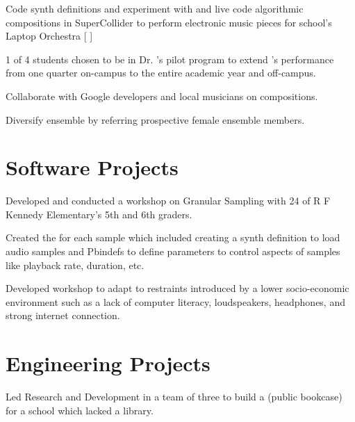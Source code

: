 \documentclass[]{deedy-resume-openfont}
\begin{document}
\begin{minipage}[t]{0.66\textwidth}
\begin{tightemize}
\item Code synth definitions and experiment with and live code algorithmic compositions in SuperCollider to perform electronic music pieces for school's Laptop Orchestra [ \href{https://www.youtube.com/watch?v=UorZXvhU6uI}{}] \item 1 of 4 students chosen to be in Dr.  \href{https://works.bepress.com/bruno-ruviaro/about/}{}'s pilot program to extend \href{https://www.youtube.com/watch?v=UorZXvhU6uI}{}'s performance from one quarter on-campus to the entire academic year and off-campus. \item Collaborate with Google developers and local musicians on compositions.\item Diversify ensemble by referring prospective female ensemble members. \end{tightemize}
\sectionsep

\section{Software Projects}
\begin{tightemize}
\item Developed and conducted a workshop on Granular Sampling with 24 of R F Kennedy Elementary's 5th and 6th graders.  
\item Created the   \href{https://github.com/tanya-sonker/sound-design-workshop}{} for each sample which included creating a synth definition to load audio samples and Pbindefs to define parameters to control aspects of samples like playback rate, duration, etc.   
\item Developed workshop to adapt to restraints introduced by a lower socio-economic environment such as a lack of computer literacy, loudspeakers, headphones, and strong internet connection.
\end{tightemize}
\sectionsep

\section{Engineering Projects}
\begin{tightemize}
\item Led Research and Development in a team of three to build a \href{https://littlefreelibrary.org}{}(public bookcase) for a school which lacked a library.
\end{tightemize}
\sectionsep

\end{minipage} 
\end{document}
